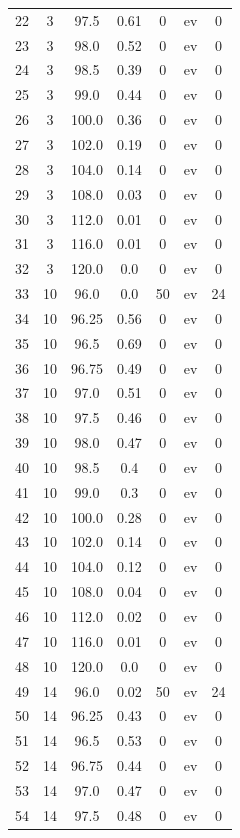 \documentclass[12pt,a4paper]{article}
\begin{document}
\begin{tabular}{r|cccccc}
	22 & 3 & 97.5 & 0.61 & 0 & ev & 0 \\
	23 & 3 & 98.0 & 0.52 & 0 & ev & 0 \\
	24 & 3 & 98.5 & 0.39 & 0 & ev & 0 \\
	25 & 3 & 99.0 & 0.44 & 0 & ev & 0 \\
	26 & 3 & 100.0 & 0.36 & 0 & ev & 0 \\
	27 & 3 & 102.0 & 0.19 & 0 & ev & 0 \\
	28 & 3 & 104.0 & 0.14 & 0 & ev & 0 \\
	29 & 3 & 108.0 & 0.03 & 0 & ev & 0 \\
	30 & 3 & 112.0 & 0.01 & 0 & ev & 0 \\
	31 & 3 & 116.0 & 0.01 & 0 & ev & 0 \\
	32 & 3 & 120.0 & 0.0 & 0 & ev & 0 \\
	33 & 10 & 96.0 & 0.0 & 50 & ev & 24 \\
	34 & 10 & 96.25 & 0.56 & 0 & ev & 0 \\
	35 & 10 & 96.5 & 0.69 & 0 & ev & 0 \\
	36 & 10 & 96.75 & 0.49 & 0 & ev & 0 \\
	37 & 10 & 97.0 & 0.51 & 0 & ev & 0 \\
	38 & 10 & 97.5 & 0.46 & 0 & ev & 0 \\
	39 & 10 & 98.0 & 0.47 & 0 & ev & 0 \\
	40 & 10 & 98.5 & 0.4 & 0 & ev & 0 \\
	41 & 10 & 99.0 & 0.3 & 0 & ev & 0 \\
	42 & 10 & 100.0 & 0.28 & 0 & ev & 0 \\
	43 & 10 & 102.0 & 0.14 & 0 & ev & 0 \\
	44 & 10 & 104.0 & 0.12 & 0 & ev & 0 \\
	45 & 10 & 108.0 & 0.04 & 0 & ev & 0 \\
	46 & 10 & 112.0 & 0.02 & 0 & ev & 0 \\
	47 & 10 & 116.0 & 0.01 & 0 & ev & 0 \\
	48 & 10 & 120.0 & 0.0 & 0 & ev & 0 \\
	49 & 14 & 96.0 & 0.02 & 50 & ev & 24 \\
	50 & 14 & 96.25 & 0.43 & 0 & ev & 0 \\
	51 & 14 & 96.5 & 0.53 & 0 & ev & 0 \\
	52 & 14 & 96.75 & 0.44 & 0 & ev & 0 \\
	53 & 14 & 97.0 & 0.47 & 0 & ev & 0 \\
	54 & 14 & 97.5 & 0.48 & 0 & ev & 0 \\

\end{tabular}
\end{document}
